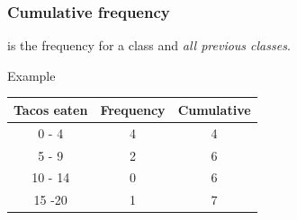 \documentclass[xcolor=table, aspectratio=169, bigger, handout]{beamer}
\begin{document}
\begin{frame}
\frametitle{Cumulative frequency}

\begin{block}{}
 is the frequency for a class and \emph{all previous classes}.
\end{block}
\pause
\begin{exampleblock}{Example}

\begin{center}
\begin{tabular}{c | c | c }
Tacos eaten & Frequency & Cumulative\\
\hline
0 - 4 & 4 & 4\\
5 - 9 & 2 & 6\\
10 - 14 & 0 & 6\\
15 -20 & 1 & 7\\
\end{tabular}
\end{center}
\end{exampleblock}
\end{frame}
\end{document}
